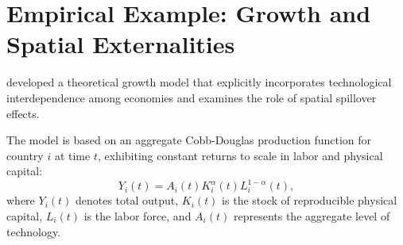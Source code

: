 \documentclass[english,12pt]{book}\usepackage[]{graphicx}\usepackage[]{xcolor}
\begin{document}
% 
% 
% 
% 
% 
% 
% 
% 

\section{Empirical Example: Growth and Spatial Externalities}

\cite{ertur2007growth} developed a theoretical growth model that explicitly incorporates technological interdependence among economies and examines the role of spatial spillover effects.

The model is based on an aggregate Cobb-Douglas production function for country $i$ at time $t$, exhibiting constant returns to scale in labor and physical capital:
\begin{equation}\label{eq:prod_func}
Y_i(t) = A_i(t)K_i^{\alpha}(t)L_i^{1- \alpha}(t), 
\end{equation}
where $Y_i(t)$ denotes total output, $K_i(t)$ is the stock of reproducible physical capital, $L_i(t)$ is the labor force, and $A_i(t)$ represents the aggregate level of technology.
\end{document}
